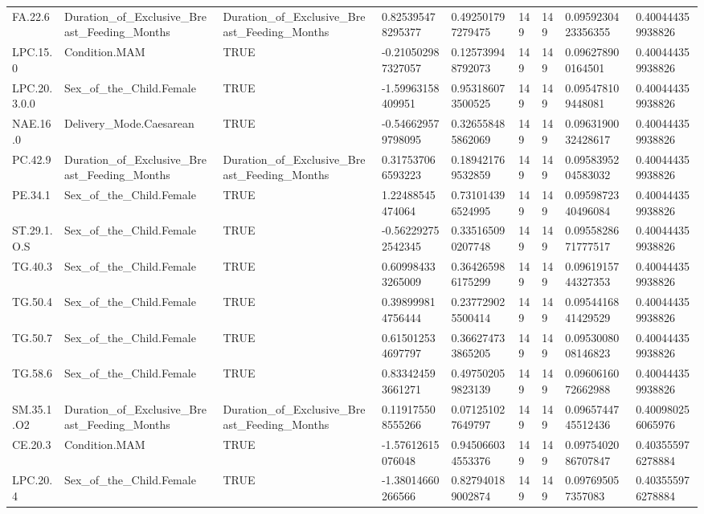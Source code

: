 \begin{longtable}{lllllllll}
FA.22.6 & Duration\_of\_Exclusive\_Breast\_Feeding\_Months & Duration\_of\_Exclusive\_Breast\_Feeding\_Months & 0.825395478295377 & 0.492501797279475 & 149 & 149 & 0.0959230423356355 & 0.400444359938826 \\
LPC.15.0 & Condition.MAM & TRUE & -0.210502987327057 & 0.125739948792073 & 149 & 149 & 0.096278900164501 & 0.400444359938826 \\
LPC.20.3.0.0 & Sex\_of\_the\_Child.Female & TRUE & -1.59963158409951 & 0.953186073500525 & 149 & 149 & 0.095478109448081 & 0.400444359938826 \\
NAE.16.0 & Delivery\_Mode.Caesarean & TRUE & -0.546629579798095 & 0.326558485862069 & 149 & 149 & 0.0963190032428617 & 0.400444359938826 \\
PC.42.9 & Duration\_of\_Exclusive\_Breast\_Feeding\_Months & Duration\_of\_Exclusive\_Breast\_Feeding\_Months & 0.317537066593223 & 0.189421769532859 & 149 & 149 & 0.0958395204583032 & 0.400444359938826 \\
PE.34.1 & Sex\_of\_the\_Child.Female & TRUE & 1.22488545474064 & 0.731014396524995 & 149 & 149 & 0.0959872340496084 & 0.400444359938826 \\
ST.29.1.O.S & Sex\_of\_the\_Child.Female & TRUE & -0.562292752542345 & 0.335165090207748 & 149 & 149 & 0.0955828671777517 & 0.400444359938826 \\
TG.40.3 & Sex\_of\_the\_Child.Female & TRUE & 0.609984333265009 & 0.364265986175299 & 149 & 149 & 0.0961915744327353 & 0.400444359938826 \\
TG.50.4 & Sex\_of\_the\_Child.Female & TRUE & 0.398999814756444 & 0.237729025500414 & 149 & 149 & 0.0954416841429529 & 0.400444359938826 \\
TG.50.7 & Sex\_of\_the\_Child.Female & TRUE & 0.615012534697797 & 0.366274733865205 & 149 & 149 & 0.0953008008146823 & 0.400444359938826 \\
TG.58.6 & Sex\_of\_the\_Child.Female & TRUE & 0.833424593661271 & 0.497502059823139 & 149 & 149 & 0.0960616072662988 & 0.400444359938826 \\
SM.35.1.O2 & Duration\_of\_Exclusive\_Breast\_Feeding\_Months & Duration\_of\_Exclusive\_Breast\_Feeding\_Months & 0.119175508555266 & 0.071251027649797 & 149 & 149 & 0.0965744745512436 & 0.400980256065976 \\
CE.20.3 & Condition.MAM & TRUE & -1.57612615076048 & 0.945066034553376 & 149 & 149 & 0.0975402086707847 & 0.403555976278884 \\
LPC.20.4 & Sex\_of\_the\_Child.Female & TRUE & -1.38014660266566 & 0.827940189002874 & 149 & 149 & 0.097695057357083 & 0.403555976278884 \\

\end{longtable}
